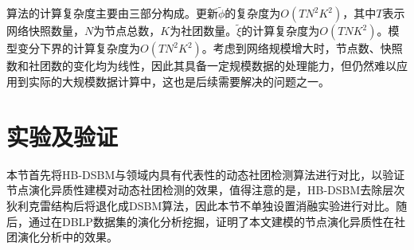 算法的计算复杂度主要由三部分构成。更新$\widetilde{\phi}$的复杂度为$O(TN^2K^2)$，其中$T$表示网络快照数量，$N$为节点总数，$K$为社团数量。$\widetilde{\xi}$的计算复杂度为$O(TNK^2)$。模型变分下界的计算复杂度为$O(TN^2K^2)$。考虑到网络规模增大时，节点数、快照数和社团数的变化均为线性，因此其具备一定规模数据的处理能力，但仍然难以应用到实际的大规模数据计算中，这也是后续需要解决的问题之一。

\section{实验及验证}





本节首先将HB-DSBM与领域内具有代表性的动态社团检测算法进行对比，以验证节点演化异质性建模对动态社团检测的效果，值得注意的是，HB-DSBM去除层次狄利克雷结构后将退化成DSBM算法，因此本节不单独设置消融实验进行对比。随后，通过在DBLP数据集的演化分析挖掘，证明了本文建模的节点演化异质性在社团演化分析中的效果。


